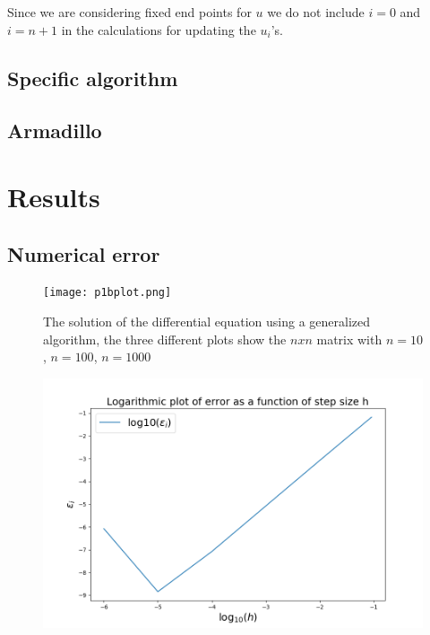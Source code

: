 \documentclass{emulateapj}
\begin{document}
%
Since we are considering fixed end points for $u$ we do not include $i = 0$ and $i = n+1$ in the calculations for updating the $u_i$'s.


\subsection{Specific algorithm}

\subsection{Armadillo}


\section{Results}
\label{sec:results}
\subsection{Numerical error}


\begin{figure}[H]
    \centering
    \texttt{[image: p1bplot.png]}
    \caption{The solution of the differential equation using a generalized algorithm, the three different plots show the $nxn$ matrix with $n=10$, $n=100$, $n=1000$ }
    \label{fig1: Generalized algorithm}
\end{figure}

\begin{figure}[H]
    \centering
    \includegraphics[size=0.25\textwidth]{plot1d.png}
    \caption{}
    \label{fig1:1d}
\end{figure}
\end{document}
